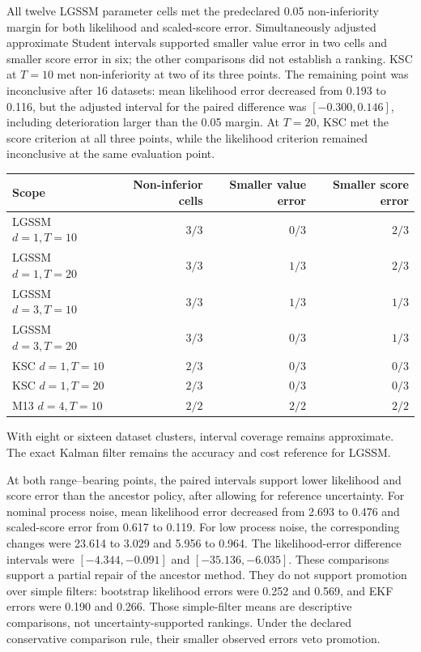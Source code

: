 All twelve LGSSM parameter cells met the predeclared 0.05 non-inferiority
margin for both likelihood and scaled-score error. Simultaneously adjusted
approximate Student intervals supported smaller value error in two cells
and smaller score error in six; the other comparisons did not establish a
ranking. KSC at $T=10$ met non-inferiority at two of its three points.
The remaining point was inconclusive after 16 datasets: mean likelihood error decreased
from 0.193 to 0.116, but the adjusted interval for the paired difference was
$[-0.300,0.146]$, including deterioration larger than the 0.05 margin.
At $T=20$, KSC met the score criterion at all three points, while the
likelihood criterion remained inconclusive at the same evaluation point.
\begin{center}
\begin{tabular}{lrrr}
\toprule
Scope & Non-inferior cells & Smaller value error & Smaller score error\\
\midrule
LGSSM $d=1,T=10$ & $3/3$ & $0/3$ & $2/3$\\
LGSSM $d=1,T=20$ & $3/3$ & $1/3$ & $2/3$\\
LGSSM $d=3,T=10$ & $3/3$ & $1/3$ & $1/3$\\
LGSSM $d=3,T=20$ & $3/3$ & $0/3$ & $1/3$\\
KSC $d=1,T=10$ & $2/3$ & $0/3$ & $0/3$\\
KSC $d=1,T=20$ & $2/3$ & $0/3$ & $0/3$\\
M13 $d=4,T=10$ & $2/2$ & $2/2$ & $2/2$\\
\bottomrule
\end{tabular}
\end{center}
With eight or sixteen dataset clusters, interval coverage remains approximate. The exact
Kalman filter remains the accuracy and cost reference for LGSSM.

At both range--bearing points, the paired intervals support lower likelihood
and score error than the ancestor policy, after allowing for reference
uncertainty. For nominal process noise, mean likelihood error decreased from
2.693 to 0.476 and scaled-score error from 0.617 to 0.119. For low process
noise, the corresponding changes were 23.614 to 3.029 and 5.956 to 0.964.
The likelihood-error difference intervals were $[-4.344,-0.091]$ and
$[-35.136,-6.035]$. These comparisons support a partial repair of the
ancestor method. They do not support promotion over simple filters:
bootstrap likelihood errors were 0.252 and 0.569, and EKF errors were
0.190 and 0.266. Those simple-filter means are descriptive comparisons,
not uncertainty-supported rankings. Under the declared conservative
comparison rule, their smaller observed errors veto promotion.

